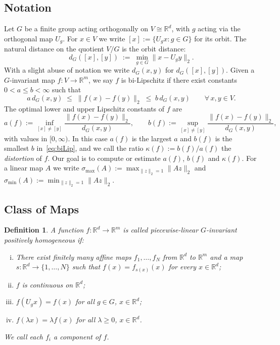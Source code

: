 \documentclass[11pt]{article}
\newcommand{\R}{\mathbb{R}}
\newcommand{\dG}[2]{d_{G}([#1], [#2])}
\newtheorem{defin}[theor]{Definition}
\theoremstyle{definition}
\begin{document}
	\subsection*{Notation}
	Let $G$ be a finite group acting orthogonally on $V \cong \R^d$, with $g$ acting
	via the orthogonal map $U_g$. For $x\in V$ we write $[x]:=\{U_gx:g\in G\}$ for
	its orbit. The natural distance on the quotient $V/G$ is the orbit distance:
	\[
	\dG{x}{y} \;:=\; \min_{g \in G} \|x - U_g y\|_2.
	\]
	With a slight abuse of notation we write $d_G(x,y)$ for $\dG{x}{y}$.
	Given a $G$-invariant map $f \colon V \to \R^m$, we say $f$ is bi-Lipschitz
		 if there exist constants $0 < a \leq b < \infty$ such that
	\begin{equation}\label{eq:biLip}
		a\,d_G(x,y) \;\leq\; \|f(x) - f(y)\|_2 \;\leq\; b\,d_G(x,y)
		\qquad \forall\, x, y \in V.
	\end{equation}
	The optimal lower and upper Lipschitz constants of $f$ are
	\[
	a(f):=\inf_{[x]\neq[y]}\frac{\|f(x)-f(y)\|_2}{d_G(x,y)},\qquad
	b(f):=\sup_{[x]\neq[y]}\frac{\|f(x)-f(y)\|_2}{d_G(x,y)},
	\]
	with values in $[0,\infty)$.  In this case $a(f)$ is the largest $a$ and $b(f)$ is the smallest $b$
	in~\eqref{eq:biLip}, and we call the ratio $\kappa(f):=b(f)/a(f)$ the
	\emph{distortion} of $f$. Our goal is to compute or
	estimate $a(f)$, $b(f)$ and $\kappa(f)$. For a linear map $A$ we write
	$\sigma_{\max}(A):=\max_{\|z\|_2=1}\|Az\|_2$ and
	$\sigma_{\min}(A):=\min_{\|z\|_2=1}\|Az\|_2$.

	\subsection*{Class of Maps}

	\begin{defin}\label{piecelinear}
		A function $f \colon \R^d \to \R^m$ is called piecewise-linear $G$-invariant
			positively homogeneous if:
		\begin{enumerate}[(i)]
			\item There exist finitely many affine maps $f_1,\dots,f_N$ from $\R^d$ to
			$\R^m$ and a map $s:\R^d\to\{1,\dots,N\}$ such that
			$f(x)=f_{s(x)}(x)$ for every $x \in \R^d$;
			\item $f$ is continuous on $\R^d$;
			\item $f(U_g x) = f(x)$ for all $g \in G$, $x \in \R^d$;
			\item $f(\lambda x) = \lambda f(x)$ for all $\lambda \geq 0$, $x \in \R^d$.
		\end{enumerate}
		 We call each $f_i$ a component of $f$.
	\end{defin}
\end{document}
